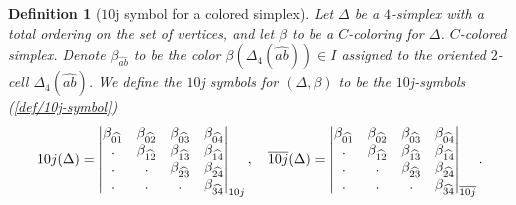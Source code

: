 \documentclass[12pt]{extarticle}
\numberwithin{equation}{section} %
\theoremstyle{mystyle}
\newtheorem{definition}[equation]{Definition}
\begin{document}
\begin{definition}[$10$j symbol for a colored simplex]\label{def/10j-symbol-for-a-C-colored-simplex}
  Let $\Delta$ be a $4$-simplex with a total ordering on the set
  of vertices, and let $\beta$ to be a $C$-coloring for $\Delta$.
  $C$-colored simplex. Denote $\beta_{\widehat{ab}}$ to be the
  color $\beta(\Delta_{4}(\widehat{ab})) \in I$ assigned to the
  oriented $2$-cell $\Delta_{4}(\widehat{ab})$. We define the
  $10$j symbols for $(\Delta,\beta)$ to be the $10$j-symbols
  (\ref{def/10j-symbol})
  $$
  10j(\Delta) = \begin{vmatrix} \beta_{\widehat{01}} & \beta_{\widehat{02}} & \beta_{\widehat{03}} & \beta_{\widehat{04}} \\ . & \beta_{\widehat{12}} & \beta_{\widehat{13}} & \beta_{\widehat{14}} \\ . & . & \beta_{\widehat{23}} & \beta_{\widehat{24}} \\ . & . & . & \beta_{\widehat{34}} \\ \end{vmatrix}_{10j}, \quad
  \overline{10j}(\Delta) = \begin{vmatrix} \beta_{\widehat{01}} & \beta_{\widehat{02}} & \beta_{\widehat{03}} & \beta_{\widehat{04}} \\ . & \beta_{\widehat{12}} & \beta_{\widehat{13}} & \beta_{\widehat{14}} \\ . & . & \beta_{\widehat{23}} & \beta_{\widehat{24}} \\ . & . & . & \beta_{\widehat{34}} \\ \end{vmatrix}_{\overline{10j}}.
  $$
\end{definition}
\end{document}
